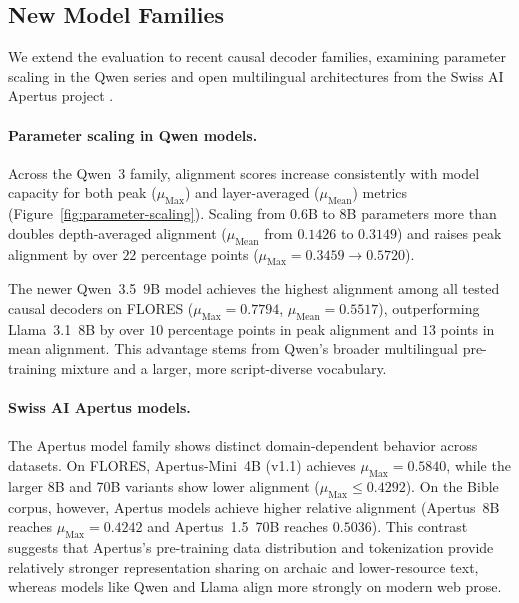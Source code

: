 \subsection{New Model Families}
\label{subsec:results-new-models}

We extend the evaluation to recent causal decoder families, examining parameter scaling in the Qwen series \citep{yang2025qwen3} and open multilingual architectures from the Swiss AI Apertus project \citep{apertus2025}.

\paragraph{Parameter scaling in Qwen models.}
Across the Qwen~3 family, alignment scores increase consistently with model capacity for both peak ($\mu_{\text{Max}}$) and layer-averaged ($\mu_{\text{Mean}}$) metrics (Figure~\ref{fig:parameter-scaling}). Scaling from 0.6B to 8B parameters more than doubles depth-averaged alignment ($\mu_{\text{Mean}}$ from $0.1426$ to $0.3149$) and raises peak alignment by over $22$ percentage points ($\mu_{\text{Max}} = 0.3459 \rightarrow 0.5720$).

The newer Qwen~3.5~9B model achieves the highest alignment among all tested causal decoders on FLORES ($\mu_{\text{Max}} = 0.7794$, $\mu_{\text{Mean}} = 0.5517$), outperforming Llama~3.1~8B by over $10$ percentage points in peak alignment and $13$ points in mean alignment. This advantage stems from Qwen's broader multilingual pre-training mixture and a larger, more script-diverse vocabulary.

\paragraph{Swiss AI Apertus models.}
The Apertus model family \citep{apertus2025} shows distinct domain-dependent behavior across datasets. On FLORES, Apertus-Mini~4B (v1.1) achieves $\mu_{\text{Max}} = 0.5840$, while the larger 8B and 70B variants show lower alignment ($\mu_{\text{Max}} \le 0.4292$). On the Bible corpus, however, Apertus models achieve higher relative alignment (Apertus~8B reaches $\mu_{\text{Max}} = 0.4242$ and Apertus~1.5~70B reaches $0.5036$). This contrast suggests that Apertus's pre-training data distribution and tokenization provide relatively stronger representation sharing on archaic and lower-resource text, whereas models like Qwen and Llama align more strongly on modern web prose.

